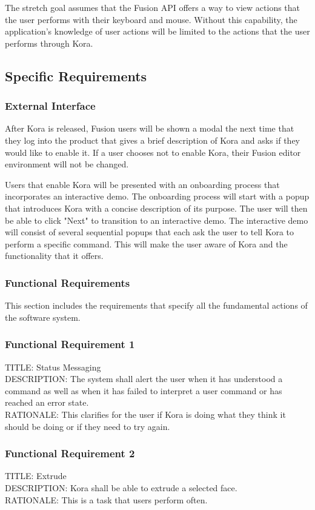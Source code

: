 \documentclass[onecolumn, draftclsnofoot,10pt, compsoc]{IEEEtran}
\def \botname{Kora\xspace}
\begin{document}
	The stretch goal assumes that the Fusion API offers a way to view actions that the user performs with their keyboard and mouse.
	Without this capability, the application's knowledge of user actions will be limited to the actions that the user performs through \botname.

	\subsection{Specific Requirements}
	\subsubsection{External Interface}
	 After \botname is released, Fusion users will be shown a modal the next time that they log into the product that gives a brief description of \botname and asks if they would like to enable it.
	If a user chooses not to enable \botname, their Fusion editor environment will not be changed.

	Users that enable \botname will be presented with an onboarding process that incorporates an interactive demo.
	The onboarding process will start with a popup that introduces \botname with a concise description of its purpose.
	The user will then be able to click "Next" to transition to an interactive demo.
	The interactive demo will consist of several sequential popups that each ask the user to tell \botname to perform a specific command.
	This will make the user aware of \botname and the functionality that it offers.

	\subsubsection{Functional Requirements}
	This section includes the requirements that specify all the fundamental actions of the software system.
	\subsubsection{Functional Requirement 1}
	TITLE: Status Messaging \\
	DESCRIPTION: The system shall alert the user when it has understood a command as well as when it has failed to interpret a user command or has reached an error state. \\
	RATIONALE: This clarifies for the user if \botname is doing what they think it should be doing or if they need to try again.

	\subsubsection{Functional Requirement 2}
	TITLE: Extrude \\
	DESCRIPTION: \botname shall be able to extrude a selected face. \\
	RATIONALE: This is a task that users perform often.
\end{document}
